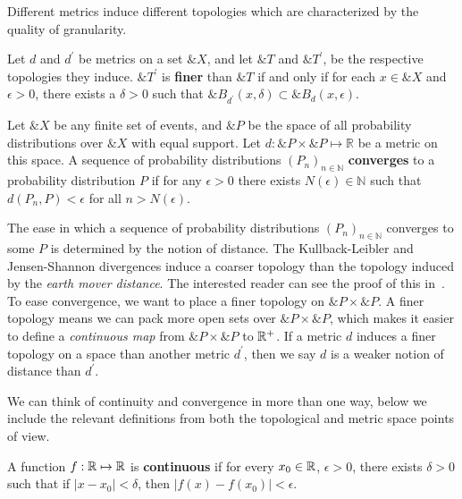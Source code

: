 Different metrics induce different topologies which are characterized
by the quality of granularity.

\begin{theorem}%
  \label{thm:granularity}
  Let $d$ and $d^\prime$ be metrics on a set $\&X$, and let $\&T$ and
  $\&T^\prime$, be the respective topologies they induce.
  $\&T^\prime$ is \textbf{finer} than $\&T$ if and only if for each
  $x \in \&X$ and $\epsilon > 0$, there exists a $\delta > 0$ such
  that $\&B_{d^\prime}(x, \delta) \subset \&B_d(x, \epsilon)$.
\end{theorem}

\begin{definition}%
  \label{def:convergence-metric-space}
  Let $\&X$ be any finite set of events, and $\&P$ be the space of all
  probability distributions over $\&X$ with equal support. Let
  $d: \&P \times \&P \mapsto \mathbb{R}$ be a metric on this space.  A
  sequence of probability distributions ${(P_n)}_{n \in \mathbb{N}}$
  \textbf{converges} to a probability distribution $P$ if for any
  $\epsilon > 0$ there exists $N(\epsilon) \in \mathbb{N}$ such that
  $d(P_n,P) < \epsilon$ for all $n > N(\epsilon)$.
\end{definition}

The ease in which a sequence of probability distributions
${(P_n)}_{n \in \mathbb{N}}$ converges to some $P$ is determined by
the notion of distance.  The Kullback-Leibler and Jensen-Shannon
divergences induce a coarser topology than the topology induced by the
\textit{earth mover distance}. The interested reader can see the proof
of this in~\cite{ref:arjovsky-2017}.  To ease convergence, we want to
place a finer topology on $\&P \times \&P$.  A finer topology means we
can pack more open sets over $\&P \times \&P$, which makes it easier
to define a \textit{continuous map} from $\&P \times \&P$ to $\mathbb{R}^+$.
If a metric $d$ induces a finer topology on a space than another
metric $d^\prime$, then we say $d$ is a weaker notion of distance than
$d^\prime$.

We can think of continuity and convergence in more than one way, below
we include the relevant definitions from both the topological and
metric space points of view.

\begin{definition}%
  \label{def:continuity-metric-space}
  A function $f: \mathbb{R} \mapsto \mathbb{R}$ is \textbf{continuous} if for every
  $x_0 \in \mathbb{R}$, $\epsilon > 0$, there exists $\delta > 0$ such that if
  $|x - x_0| < \delta$, then $|f(x) - f(x_0)| < \epsilon$.
\end{definition}

